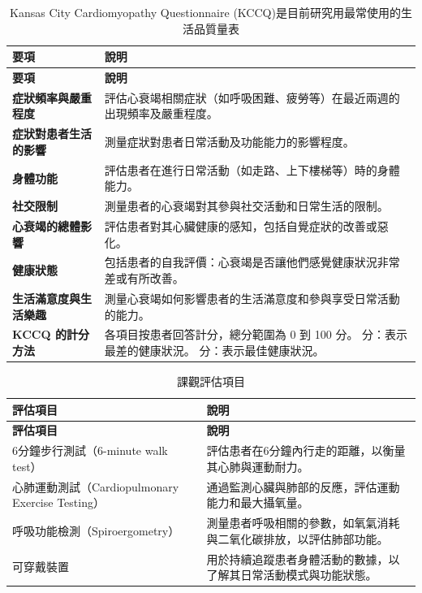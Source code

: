 \documentclass[nols]{tufte-book}
\begin{document}
\begin{longtable}{p{3cm} p{12cm}}
\caption{Kansas City Cardiomyopathy Questionnaire (KCCQ)是目前研究用最常使用的生活品質量表}
\label{table KCCQ}
\hline
\textbf{要項} & \textbf{說明} \\ \hline
\endfirsthead
\hline
\textbf{要項} & \textbf{說明} \\ \hline
\endhead
\hline
\endfoot

\textbf{症狀頻率與嚴重程度} & 評估心衰竭相關症狀（如呼吸困難、疲勞等）在最近兩週的出現頻率及嚴重程度。 \\ \hline
\textbf{症狀對患者生活的影響} & 測量症狀對患者日常活動及功能能力的影響程度。 \\ \hline
\textbf{身體功能} & 評估患者在進行日常活動（如走路、上下樓梯等）時的身體能力。 \\ \hline
\textbf{社交限制} & 測量患者的心衰竭對其參與社交活動和日常生活的限制。 \\ \hline
\textbf{心衰竭的總體影響} & 評估患者對其心臟健康的感知，包括自覺症狀的改善或惡化。 \\ \hline
\textbf{健康狀態} & 包括患者的自我評價：心衰竭是否讓他們感覺健康狀況非常差或有所改善。 \\ \hline
\textbf{生活滿意度與生活樂趣} & 測量心衰竭如何影響患者的生活滿意度和參與享受日常活動的能力。 \\ \hline
\textbf{KCCQ 的計分方法} & 各項目按患者回答計分，總分範圍為 0 到 100 分。\newline
0 分：表示最差的健康狀況。\newline
100 分：表示最佳健康狀況。 \\ \hline

\end{longtable}



\begin{longtable}{p{5cm} p{10cm}}
\caption{課觀評估項目}
\label{table objective evaluation}
\hline
\textbf{評估項目} & \textbf{說明} \\ \hline
\endfirsthead
\hline
\textbf{評估項目} & \textbf{說明} \\ \hline
\endhead
\hline
\endfoot

6分鐘步行測試（6-minute walk test） & 評估患者在6分鐘內行走的距離，以衡量其心肺與運動耐力。 \\ \hline
心肺運動測試（Cardiopulmonary Exercise Testing） & 通過監測心臟與肺部的反應，評估運動能力和最大攝氧量。 \\ \hline
呼吸功能檢測（Spiroergometry） & 測量患者呼吸相關的參數，如氧氣消耗與二氧化碳排放，以評估肺部功能。 \\ \hline
可穿戴裝置 & 用於持續追蹤患者身體活動的數據，以了解其日常活動模式與功能狀態。 \\ \hline

\end{longtable}
\end{document}
